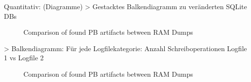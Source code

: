 Quantitativ: (Diagramme)		
	> Gestacktes Balkendiagramm zu veränderten SQLite DBs
	\begin{figure}[h!]
		\centerline{}
		\label{chart:final-criteria}  
		\caption{Comparison of found PB artifacts between RAM Dumps}
	\end{figure}
	> Balkendiagramm: Für jede Logfilekategorie: Anzahl Schreiboperationen Logfile 1 vs Logfile 2
	\begin{figure}[h!]
		\centerline{}
		\label{chart:final-criteria}  
		\caption{Comparison of found PB artifacts between RAM Dumps}
	\end{figure}

